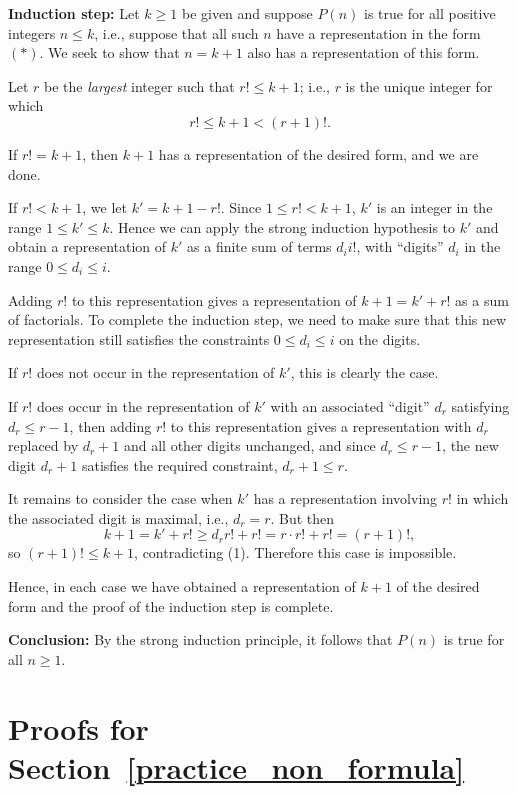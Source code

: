 \textbf{Induction step:} 
Let $k\ge1$ be given and suppose $P(n)$ is true for all positive
integers $ n\le k$, i.e., suppose that all such $n$ have a
representation in the form $(*)$. We seek to show that $n=k+1$ also has a
representation of this form. 

Let $r$ be the \emph{largest} integer such that $r!\le k+1$; i.e., $r$ is the
unique integer for which  
\[
r!\le k+1 < (r+1)!.
\tag{1}
\]

If $r!=k+1$, then $k+1$ has a representation of the desired form,
and we are done.

If $r!<k+1$, we let $k'=k+1-r!$.  Since $1\le r!<k+1$, 
$k'$ is an integer in the range $1\le k'\le k$. 
Hence we can apply the strong induction hypothesis to $k'$ and obtain a
representation of $k'$ as a finite sum of terms $d_ii!$, with ``digits'' 
$d_i$ in the range $0\le d_i\le i$.  

Adding $r!$ to this representation gives a representation of $k+1=k'+r!$
as a sum of factorials.  To complete the induction step, we need to make sure
that this new representation still satisfies the constraints $0\le d_i\le i$ 
on the digits. 

If $r!$ does not occur in the representation of $k'$, this is clearly the case.

If $r!$ does occur in the representation of $k'$ with an associated
``digit'' $d_r$ satisfying $d_r\le r-1$, 
then adding $r!$ to this representation gives a
representation with $d_r$ replaced by $d_r+1$ and all other digits unchanged, 
and since $d_r\le r-1$, the new digit $d_r+1$ satisfies the required
constraint, $d_r+1\le r$.

It remains to consider the case when $k'$ has a representation involving $r!$
in which the associated digit is maximal, i.e., $d_r=r$. But then 
\[
k+1=k'+r!\ge d_rr!+r! =r\cdot r! + r!=(r+1)!,
\]
so $(r+1)!\le k+1$, contradicting (1). Therefore this case is impossible. 

Hence, in each case we have obtained a representation of $k+1$ of the 
desired form and the proof of the 
induction step is complete.

\textbf{Conclusion:} By the strong induction principle, 
it follows that $P(n)$  is true for all $n\ge1$.

\section{Proofs for Section~\ref{practice_non_formula}}

